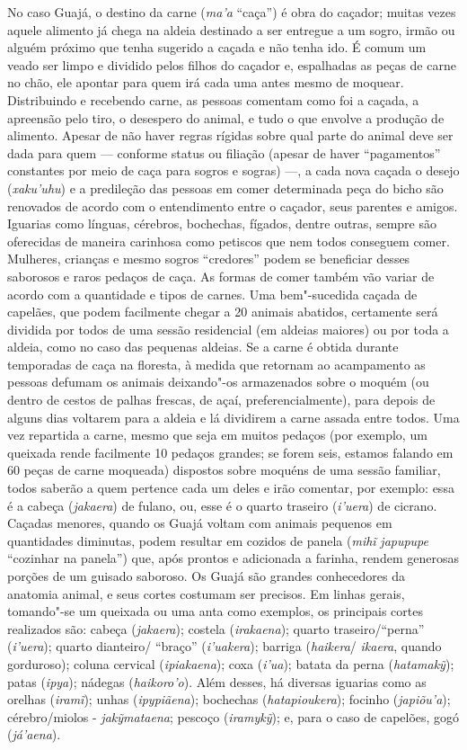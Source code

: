 No caso Guajá, o destino da carne (\emph{ma'a} ``caça'') é obra do
caçador; muitas vezes aquele alimento já chega na aldeia destinado a ser
entregue a um sogro, irmão ou alguém próximo que tenha sugerido a caçada
e não tenha ido. É comum um veado ser limpo e dividido pelos filhos do
caçador e, espalhadas as peças de carne no chão, ele apontar para quem
irá cada uma antes mesmo de moquear. Distribuindo e recebendo carne, as
pessoas comentam como foi a caçada, a apreensão pelo tiro, o desespero
do animal, e tudo o que envolve a produção de alimento. Apesar de não
haver regras rígidas sobre qual parte do animal deve ser dada para quem
--- conforme status ou filiação (apesar de haver ``pagamentos'' constantes
por meio de caça para sogros e sogras) ---, a cada nova caçada o desejo
(\emph{xaku'uhu}) e a predileção das pessoas em comer determinada peça
do bicho são renovados de acordo com o entendimento entre o caçador,
seus parentes e amigos. Iguarias como línguas, cérebros, bochechas,
fígados, dentre outras, sempre são oferecidas de maneira carinhosa como
petiscos que nem todos conseguem comer. Mulheres, crianças e mesmo
sogros ``credores'' podem se beneficiar desses saborosos e raros pedaços
de caça. As formas de comer também vão variar de acordo com a quantidade
e tipos de carnes. Uma bem"-sucedida caçada de capelães, que podem
facilmente chegar a 20 animais abatidos, certamente será dividida por
todos de uma sessão residencial (em aldeias maiores) ou por toda a
aldeia, como no caso das pequenas aldeias. Se a carne é obtida durante
temporadas de caça na floresta, à medida que retornam ao acampamento as
pessoas defumam os animais deixando"-os armazenados sobre o moquém (ou
dentro de cestos de palhas frescas, de açaí, preferencialmente), para
depois de alguns dias voltarem para a aldeia e lá dividirem a carne
assada entre todos. Uma vez repartida a carne, mesmo que seja em muitos
pedaços (por exemplo, um queixada rende facilmente 10 pedaços grandes;
se forem seis, estamos falando em 60 peças de carne moqueada) dispostos
sobre moquéns de uma sessão familiar, todos saberão a quem pertence cada
um deles e irão comentar, por exemplo: essa é a cabeça (\emph{jakaera})
de fulano, ou, esse é o quarto traseiro (\emph{i'uera}) de cicrano.
Caçadas menores, quando os Guajá voltam com animais pequenos em
quantidades diminutas, podem resultar em cozidos de panela (\emph{mihĩ}
\emph{japupupe} ``cozinhar na panela'') que, após prontos e adicionada a
farinha, rendem generosas porções de um guisado saboroso. Os Guajá são
grandes conhecedores da anatomia animal, e seus cortes costumam ser
precisos. Em linhas gerais, tomando"-se um queixada ou uma anta como
exemplos, os principais cortes realizados são: cabeça (\emph{jakaera});
costela (\emph{irakaena}); quarto traseiro/``perna'' (\emph{i'uera});
quarto dianteiro/ ``braço'' (\emph{i'uakera}); barriga (\emph{haikera}/
\emph{ikaera}, quando gorduroso); coluna cervical (\emph{ipiakaena});
coxa (\emph{i'ua}); batata da perna (\emph{hatamakỹ}); patas
(\emph{ipya}); nádegas (\emph{haikoro'o}). Além desses, há diversas
iguarias como as orelhas (\emph{iramĩ}); unhas (\emph{ipypiãena});
bochechas (\emph{hatapioukera}); focinho (\emph{japiõu'a});
cérebro/miolos - \emph{jakỹmataena}; pescoço (\emph{iramykỹ}); e, para
o caso de capelões, gogó (\emph{já'aena}).


